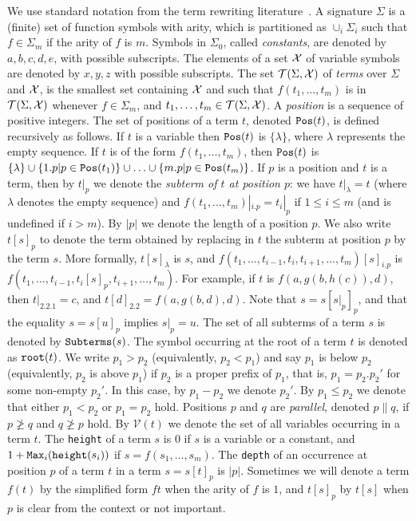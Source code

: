 \documentclass{LMCS}
\theoremstyle{plain}
\newcommand\subterms[1]{{{\tt Subterms}(}{#1}{)}}
\def\Tau{{\mathcal T}}
\def\Vars{{\mathcal V}}
\begin{document}
\noindent We use standard notation from the
term rewriting literature~\cite{Allthat}.
A signature $\Sigma$ is a (finite) set of function
symbols with arity, which is partitioned as $\cup_i\Sigma_i$
such that $f\in\Sigma_m$ if the arity of $f$ is $m$.
Symbols in $\Sigma_0$,
called {\em constants},
are denoted by $a,b,c,d,e$, with possible subscripts.
The elements of a set ${\mathcal X}$ of 
variable symbols are denoted by $x,y,z$ with possible subscripts. 
The set
$\Tau(\Sigma,\X)$
of {\em terms} over $\Sigma$ and ${\mathcal X}$,
is the smallest set containing ${\mathcal X}$ and
such that $f(t_1,\dots,t_m)$ is in $\Tau(\Sigma,\X)$
whenever $f \in \Sigma_m$,
and $t_1,\dots,t_m \in \Tau(\Sigma,\X)$. A
{\it position\/} is a sequence of positive integers.
The set of positions of a term $t$, denoted ${\tt Pos}(t)$,
is defined recursively as follows. If $t$ is a variable
then ${\tt Pos}(t)$ is $\{\lambda\}$, where $\lambda$
represents the empty sequence. If $t$ is of the
form $f(t_1,\ldots,t_m)$, then ${\tt Pos}(t)$ is
$\{\lambda\}\cup\{1.p|p\in{\tt Pos}(t_1)\}\cup\ldots\cup
\{m.p|p\in{\tt Pos}(t_m)\}$.
If $p$ is a
position and $t$ is a term, then by $t|_p$ we denote the {\em subterm
of $t$ at position $p$\/}: we have $t|_\lambda = t$ (where $\lambda$
denotes the empty sequence) and $f(t_1,\ldots,t_m)|_{i.p} = t_i|_p$ if
$1\leq i \leq m$ (and is undefined if $i>m$).
By $|p|$ we denote the length of a position $p$.
We also write $t[s]_p$
to denote the term obtained by replacing in $t$ the subterm at
position $p$ by the term $s$.
More formally, $t[s]_\lambda$ is $s$, and
$f(t_1,\ldots,t_{i-1},t_i,t_{i+1},\ldots,t_m)[s]_{i.p}$ is
$f(t_1,\ldots,t_{i-1},t_i[s]_{p},t_{i+1},\ldots,t_m)$.
For example, if $t$ is
$f(a,g(b,h(c)),d)$, then $t|_{2.2.1} = c$, and $t[d]_{2.2}=
f(a,g(b,d),d)$.
Note that $s=s[s|_p]_{p}$, and that the equality $s=s[u]_p$
implies $s|_p=u$.
The set of all subterms of a term $s$ is
denoted by $\subterms{s}$.
The symbol occurring at the root of a term $t$
is denoted as ${\tt root}(t)$.
We write $p_1 > p_2$ (equivalently, $p_2 < p_1$)
and say $p_1$ is below $p_2$
(equivalently, $p_2$ is above $p_1$) if $p_2$ is a proper
prefix of $p_1$, that is, $p_1 = p_2.p_2'$ for some non-empty $p_2'$.
In this case, by $p_1-p_2$ we denote $p_2'$.
By $p_1\leq p_2$ we denote that either $p_1<p_2$ or $p_1=p_2$ hold.
Positions $p$ and $q$ are {\em parallel}, denoted $p\parallel q$,
if $p\not\geq q$ and
$q\not\geq p$ hold.
By $\Vars(t)$ we denote the set of all variables occurring in a term $t$.
The {\tt height} of a term $s$ is $0$ if $s$ is a variable or a constant,
and $1+{\tt Max}_i({\tt height}(s_i))$ if $s=f(s_1,\ldots,s_m)$.
The {\tt depth} of an occurrence at position $p$ of a term $t$ in
a term $s=s[t]_p$ is $|p|$.
Sometimes we will denote a term $f(t)$ by
the simplified form $ft$ when the arity of $f$ is $1$, and $t[s]_p$ by
$t[s]$ when $p$ is clear from the context or not important.
\end{document}
